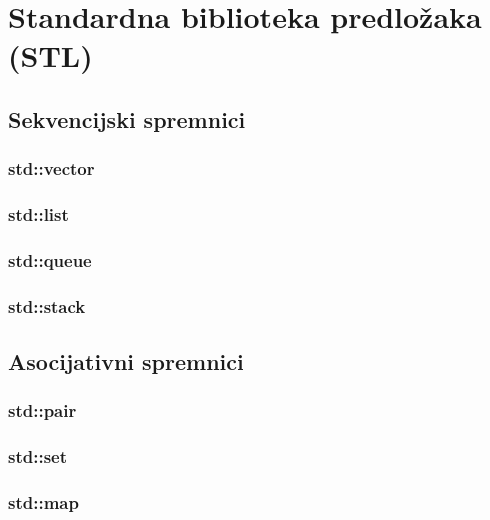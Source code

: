 \chapter{Standardna biblioteka predložaka (STL)}

\section{Sekvencijski spremnici}

\subsection{std::vector}

\subsection{std::list}

\subsection{std::queue}

\subsection{std::stack}

\section{Asocijativni spremnici}

\subsection{std::pair}

\subsection{std::set}

\subsection{std::map}
